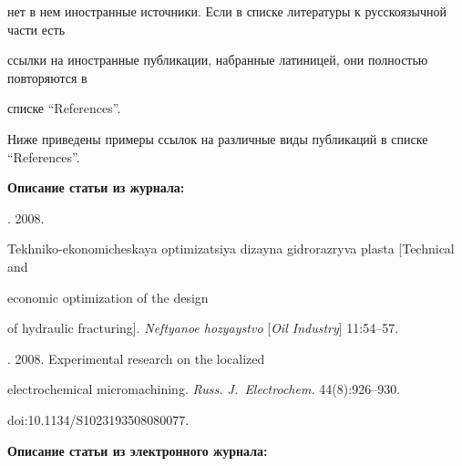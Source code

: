 {\begin{enumerate}[1.]
нет в нем иностранные источники. Если в списке литературы к русскоязычной части есть


ссылки на иностранные публикации, набранные латиницей, они полностью повторяются в


списке ``References''.





Ниже приведены примеры ссылок на различные виды публикаций в списке ``References''.





\def\leftfootline{\small{\textbf{\thepage}


\hfill ИНФОРМАТИКА И ЕЁ ПРИМЕНЕНИЯ\ \ \ том\ 18\ \ \ выпуск\ 3\ \ \ 2024}


}%


 \def\rightfootline{\small{ИНФОРМАТИКА И ЕЁ ПРИМЕНЕНИЯ\ \ \ том\ 18\ \ \ выпуск\ 3\ \ \ 2024


\hfill \textbf{\thepage}}}





{\small





\noindent


\textbf{Описание статьи из журнала:}





. 2008.


Tekhniko-ekonomicheskaya optimizatsiya dizayna gidrorazryva plasta [Technical and


economic optimization of the design


of hydraulic fracturing]. \textit{Neftyanoe hozyaystvo} [\textit{Oil Industry}] 11:54--57.





. 2008. Experimental research on the localized


electrochemical micromachining. \textit{Russ. J.~Electrochem.}  44(8):926--930.


{\sf doi:10.1134/S1023193508080077}.





\noindent


\textbf{Описание статьи из электронного журнала:}





}
\end{enumerate}}
